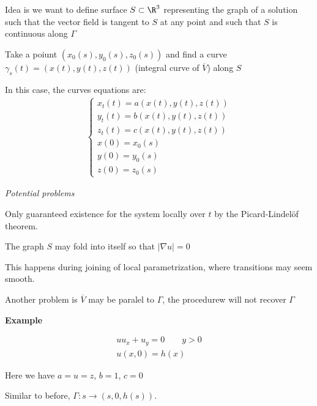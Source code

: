 Idea is we want to define surface $S\subset\R^3$ representing the graph of a solution such that the vector field is tangent to $S$ at any point and such that $S$ is continuous along $\Gamma$\par
\noindent Take a poiunt $(x_0(s), y_0(s),z_0(s))$ and find a curve $\gamma_s(t) = (x(t),y(t),z(t))$ (integral curve of $\overline{V}$) along $S$
\par\bigskip
\noindent In this case, the curves equations are:
\begin{equation*}
  \begin{gathered}
    \begin{cases}
      x_t(t) = a(x(t),y(t),z(t))\\
      y_t(t) = b(x(t),y(t),z(t))\\
      z_t(t)= c(x(t),y(t),z(t))\\
      x(0)= x_0(s)\\
      y(0) = y_0(s)\\
      z(0) = z_0(s)
    \end{cases}
  \end{gathered}
\end{equation*}
\par\bigskip
\noindent\textit{Potential problems}\par
\noindent Only guaranteed existence for the system locally over $t$  by the Picard-Lindelöf theorem.\par
\noindent The graph $S$ may fold into itself so that $\left|\nabla u\right| = 0$\par
\noindent This happens during joining of local parametrization, where transitions may seem smooth.\par
\noindent Another problem is $\overline{V}$  may be paralel to $\Gamma$, the procedurew will not recover $\Gamma$ 
\par\bigskip
\noindent\textbf{Example}\par

\begin{equation*}
  \begin{gathered}
    uu_x+u_y=0\qquad y>0\\
    u(x,0) = h(x)
  \end{gathered}
\end{equation*}\par
\noindent Here we have $a = u = z$, $b = 1$, $c = 0$\par
\noindent Similar to before, $\Gamma:s\to(s,0,h(s))$. 
